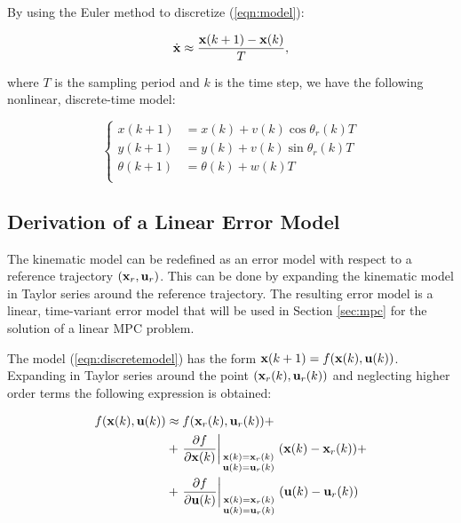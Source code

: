 \documentclass[conference]{IEEEtran} %
\begin{document}
By using the Euler method to discretize (\ref{eqn:model}):

\begin{equation*}
	\dot{\bf x} \approx \frac{{\bf x}(k+1)-{\bf x}(k)}{T},
\end{equation*}

\noindent where $T$ is the sampling period and $k$ is the time step, we have
the following nonlinear, discrete-time model:

\begin{equation}
\label{eqn:discretemodel}
	\left\{
		\begin{aligned}
			x(k+1)	    &= x(k) + v(k)\cos\theta_r(k)T \\
			y(k+1)	    &= y(k) + v(k)\sin\theta_r(k)T \\
			\theta(k+1) &= \theta(k) + w(k)T \\
		\end{aligned}
	\right.
\end{equation} 

\subsection{Derivation of a Linear Error Model}

The kinematic model can be redefined as an error model with respect to a
reference trajectory $({\bf x}_r,{\bf u}_r)$. This can be done by expanding
the kinematic model in Taylor series around the reference trajectory. The
resulting error model is a linear, time-variant error model that will be
used in Section \ref{sec:mpc} for the solution of a linear MPC problem.

The model (\ref{eqn:discretemodel}) has the form ${\bf x}(k+1)=f({\bf
x}(k),{\bf u}(k))$. Expanding in Taylor series around the point $({\bf
x}_r(k),{\bf u}_r(k))$ and neglecting higher order
terms the following expression is obtained:

\begin{equation}
\begin{split}
\label{eq:taylor}
	f({\bf x}(k),{\bf u}(k)) &\approx f({\bf x}_r(k),{\bf u}_r(k)) + \\ &+ \left.\frac{\partial f}{\partial{\bf x}(k)}\right|_{\begin{smallmatrix}{\bf x}(k)={\bf x}_r(k) \\ {\bf u}(k)={\bf u}_r(k) \end{smallmatrix}}({\bf x}(k)-{\bf x}_r(k)) + \\ &+ \left.\frac{\partial f}{\partial{\bf u}(k)}\right|_{\begin{smallmatrix}{\bf x}(k)={\bf x}_r(k) \\ {\bf u}(k)={\bf u}_r(k) \end{smallmatrix}}({\bf u}(k)-{\bf u}_r(k))
\end{split}
\end{equation}
\end{document}
